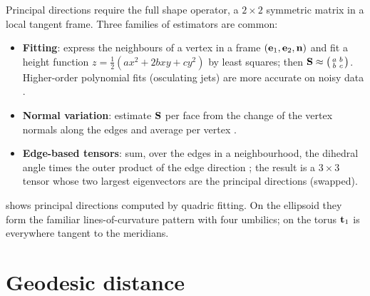Principal directions require the full shape operator, a $2\times2$ symmetric matrix in a local
tangent frame. Three families of estimators are common:
\begin{itemize}
  \item \textbf{Fitting}: express the neighbours of a vertex in a frame $(\mathbf{e}_1,\mathbf{e}_2,\mathbf{n})$ and fit
  a height function $z=\tfrac12(ax^2+2bxy+cy^2)$ by least squares; then
  $\mathbf{S}\approx\begin{psmallmatrix}a&b\\b&c\end{psmallmatrix}$. Higher-order polynomial fits
  (osculating jets) are more accurate on noisy data \citep{Cazals2005}.
  \item \textbf{Normal variation}: estimate $\mathbf{S}$ per face from the change of the vertex normals
  along the edges and average per vertex \citep{Rusinkiewicz2004}.
  \item \textbf{Edge-based tensors}: sum, over the edges in a neighbourhood, the dihedral angle
  times the outer product of the edge direction \citep{Taubin1995b,Cohen2003}; the result is a
  $3\times3$ tensor whose two largest eigenvectors are the principal directions (swapped).
\end{itemize}
 shows principal directions computed by quadric fitting. On the ellipsoid
they form the familiar lines-of-curvature pattern with four umbilics; on the torus $\mathbf{t}_1$ is
everywhere tangent to the meridians.


\section{Geodesic distance}

